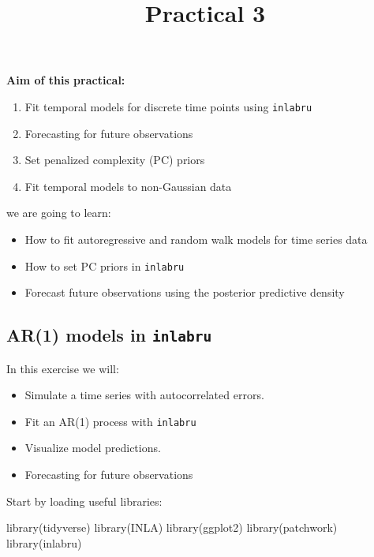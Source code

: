 \documentclass[
  letterpaper,
  DIV=11,
  numbers=noendperiod]{scrartcl}
\title{Practical 3}
\author{}
\date{}
\makeatletter
\newenvironment{Shaded}{\begin{snugshade}}{\end{snugshade}}
\newcommand{\FunctionTok}[1]{\textcolor[rgb]{0.28,0.35,0.67}{#1}}
\newcommand{\NormalTok}[1]{\textcolor[rgb]{0.00,0.23,0.31}{#1}}
\providecommand{\tightlist}{%
  \setlength{\itemsep}{0pt}\setlength{\parskip}{0pt}}\usepackage{longtable,booktabs,array}
\renewcommand{\maketitle}{\bgroup\setlength{\parindent}{0pt}
\begin{flushleft}
  {\sffamily\huge\textbf{\MakeUppercase{\@title}}} \vspace{0.3cm} \newline
  {\Large {\@subtitle}} \newline
  \@author
\end{flushleft}\egroup
}
\makeatother
\begin{document}
\maketitle

\pagestyle{mystyle}


\textbf{Aim of this practical:}

\begin{enumerate}
\def\labelenumi{\arabic{enumi}.}
\tightlist
\item
  Fit temporal models for discrete time points using \texttt{inlabru}
\item
  Forecasting for future observations
\item
  Set penalized complexity (PC) priors
\item
  Fit temporal models to non-Gaussian data
\end{enumerate}

we are going to learn:

\begin{itemize}
\tightlist
\item
  How to fit autoregressive and random walk models for time series data
\item
  How to set PC priors in \texttt{inlabru}
\item
  Forecast future observations using the posterior predictive density
\end{itemize}

\subsection{\texorpdfstring{AR(1) models in
\texttt{inlabru}}{AR(1) models in inlabru}}\label{ar1-models-in-inlabru}

In this exercise we will:

\begin{itemize}
\item
  Simulate a time series with autocorrelated errors.
\item
  Fit an AR(1) process with \texttt{inlabru}
\item
  Visualize model predictions.
\item
  Forecasting for future observations
\end{itemize}

Start by loading useful libraries:

\begin{Shaded}
\begin{Highlighting}[]
\FunctionTok{library}\NormalTok{(tidyverse)}
\FunctionTok{library}\NormalTok{(INLA)}
\FunctionTok{library}\NormalTok{(ggplot2)}
\FunctionTok{library}\NormalTok{(patchwork)}
\FunctionTok{library}\NormalTok{(inlabru)     }
\end{Highlighting}
\end{Shaded}
\end{document}
